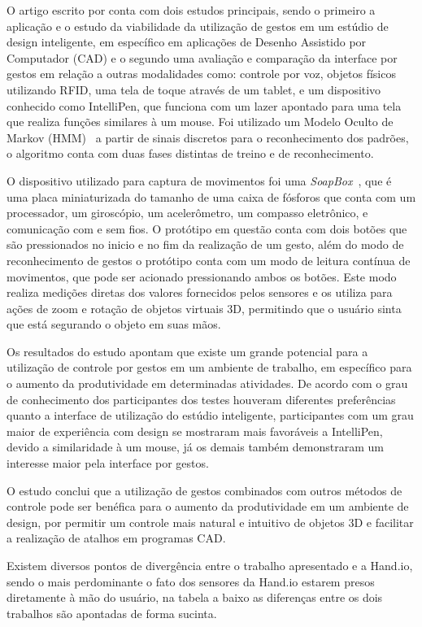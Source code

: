 O artigo escrito por  conta com dois estudos principais, sendo o primeiro a aplicação e o estudo da viabilidade da utilização de gestos em um estúdio de design inteligente, em específico em aplicações de Desenho Assistido por Computador (CAD) e o segundo uma avaliação e comparação da interface por gestos em relação a outras modalidades como: controle por voz, objetos físicos utilizando RFID, uma tela de toque através de um tablet, e um dispositivo conhecido como IntelliPen, que funciona com um lazer apontado para uma tela que realiza funções similares à um mouse. Foi utilizado um Modelo Oculto de Markov (HMM)~\cite{hmm:1989} a partir de sinais discretos para o reconhecimento dos padrões, o algoritmo conta com duas fases distintas de treino e de reconhecimento.


O dispositivo utilizado para captura de movimentos foi uma \textit{SoapBox}~\cite{soapbox:2002}, que é uma placa miniaturizada do tamanho de uma caixa de fósforos que conta com um processador, um giroscópio, um acelerômetro, um compasso eletrônico, e comunicação com e sem fios. O protótipo em questão conta com dois botões que são pressionados no inicio e no fim da realização de um gesto, além do modo de reconhecimento de gestos o protótipo conta com um modo de leitura contínua de movimentos, que pode ser acionado pressionando ambos os botões. Este modo realiza medições diretas dos valores fornecidos pelos sensores e os utiliza para ações de zoom e rotação de objetos virtuais 3D, permitindo que o usuário sinta que está segurando o objeto em suas mãos.

Os resultados do estudo apontam que existe um grande potencial para a utilização de controle por gestos em um ambiente de trabalho, em específico para o aumento da produtividade em determinadas atividades. De acordo com o grau de conhecimento dos participantes dos testes houveram diferentes preferências quanto a interface de utilização do estúdio inteligente, participantes com um grau maior de experiência com design se mostraram mais favoráveis a IntelliPen, devido a similaridade à um mouse, já os demais também demonstraram um interesse maior pela interface por gestos. 

O estudo conclui que a utilização de gestos combinados com outros métodos de controle pode ser benéfica para o aumento da produtividade em um ambiente de design, por permitir um controle mais natural e intuitivo de objetos 3D e facilitar a realização de atalhos em programas CAD.

Existem diversos pontos de divergência entre o trabalho apresentado e a Hand.io, sendo o mais perdominante o fato dos sensores da Hand.io estarem presos diretamente à mão do usuário, na tabela a baixo as diferenças entre os dois trabalhos são apontadas de forma sucinta.

